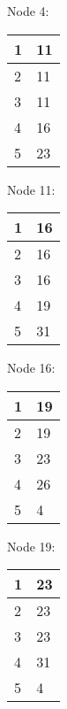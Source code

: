 \documentclass{scrartcl}
\begin{document}
	\begin{minipage}[t]{.25\linewidth}
        \centering
        Node 4:\\
			\begin{tabular}{|l|l|}
				\hline
				1 & 11 \\ \hline
				2 & 11 \\ \hline
				3 & 11 \\ \hline
				4 & 16 \\ \hline
				5 & 23 \\ \hline
			\end{tabular}
	\end{minipage}%
	\begin{minipage}[t]{.25\linewidth}
        \centering
        Node 11:\\
		\begin{tabular}{|l|l|}
			\hline
			1 & 16 \\ \hline
			2 & 16 \\ \hline
			3 & 16 \\ \hline
			4 & 19 \\ \hline
			5 & 31 \\ \hline
		\end{tabular}
	\end{minipage}%
	\begin{minipage}[t]{.25\linewidth}
        \centering
        Node 16:\\
		\begin{tabular}{|l|l|}
			\hline
			1 & 19 \\ \hline
			2 & 19 \\ \hline
			3 & 23 \\ \hline
			4 & 26 \\ \hline
			5 & 4 \\ \hline
		\end{tabular}
    \end{minipage}
    \begin{minipage}[t]{.25\linewidth}
        \centering
        Node 19:\\
        \begin{tabular}{|l|l|}
            \hline
            1 & 23 \\ \hline
            2 & 23 \\ \hline
            3 & 23 \\ \hline
            4 & 31 \\ \hline
            5 & 4 \\ \hline
        \end{tabular}
    \end{minipage}%
\end{document}
